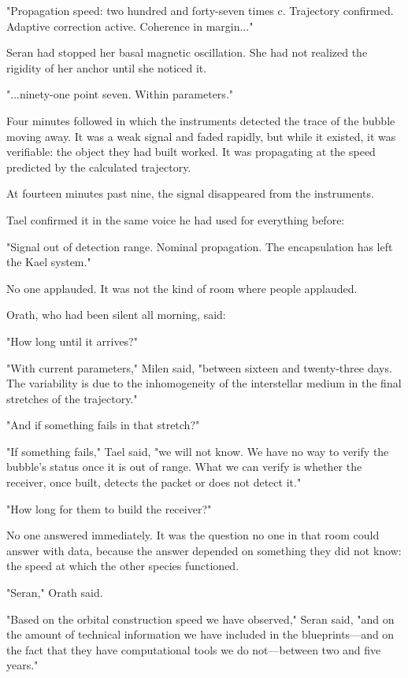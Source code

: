 \documentclass[11pt,a5paper,twoside]{book}
\begin{document}
"Propagation speed: two hundred and forty-seven times c. Trajectory confirmed. Adaptive correction active. Coherence in margin..."

Seran had stopped her basal magnetic oscillation. She had not realized the rigidity of her anchor until she noticed it.

"...ninety-one point seven. Within parameters."

Four minutes followed in which the instruments detected the trace of the bubble moving away. It was a weak signal and faded rapidly, but while it existed, it was verifiable: the object they had built worked. It was propagating at the speed predicted by the calculated trajectory.

At fourteen minutes past nine, the signal disappeared from the instruments.

Tael confirmed it in the same voice he had used for everything before:

"Signal out of detection range. Nominal propagation. The encapsulation has left the Kael system."

No one applauded. It was not the kind of room where people applauded.

Orath, who had been silent all morning, said:

"How long until it arrives?"

"With current parameters," Milen said, "between sixteen and twenty-three days. The variability is due to the inhomogeneity of the interstellar medium in the final stretches of the trajectory."

"And if something fails in that stretch?"

"If something fails," Tael said, "we will not know. We have no way to verify the bubble's status once it is out of range. What we can verify is whether the receiver, once built, detects the packet or does not detect it."

"How long for them to build the receiver?"

No one answered immediately. It was the question no one in that room could answer with data, because the answer depended on something they did not know: the speed at which the other species functioned.

"Seran," Orath said.

"Based on the orbital construction speed we have observed," Seran said, "and on the amount of technical information we have included in the blueprints—and on the fact that they have computational tools we do not—between two and five years."
\end{document}
